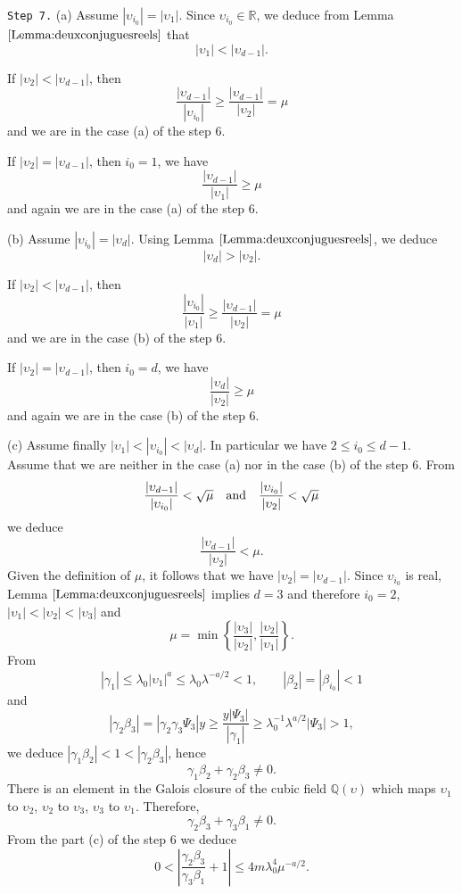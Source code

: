 \documentclass[leqno,11pt]{article}
\def\Q{\mathbb{Q}}
\def\R{\mathbb{R}}
\begin{document}
\indent
{\tt Step 7.} 
(a) Assume $|\upsilon_{i_0}|=|\upsilon_1|$. Since $\upsilon_{i_0}\in\R$, we deduce from Lemma $\ref{Lemma:deuxconjuguesreels}$ that
$$
|\upsilon_1|<|\upsilon_{d-1}|.
$$

If $|\upsilon_2|<|\upsilon_{d-1}|$, then 
$$
\frac{|\upsilon_{d-1}|}{|\upsilon_{i_0}|}\ge \frac{|\upsilon_{d-1}|}{|\upsilon_{2}|}=\mu
$$
and we are in the case (a) of the step 6. 

If $|\upsilon_2|=|\upsilon_{d-1}|$, then $i_0=1$, we have 
$$
\frac{|\upsilon_{d-1}|}{|\upsilon_1|}\ge \mu
$$
and again we are in the case (a) of the step 6. 

\indent
(b) Assume $|\upsilon_{i_0}|=|\upsilon_d|$. Using Lemma $\ref{Lemma:deuxconjuguesreels}$, we deduce 
$$
|\upsilon_d|>|\upsilon_2|.
$$

If $|\upsilon_2|<|\upsilon_{d-1}|$, then 
$$
\frac{|\upsilon_{i_0}|}{|\upsilon_1|}\ge \frac{|\upsilon_{d-1}|}{|\upsilon_{2}|}=\mu
$$
and we are in the case (b) of the step 6. 

If $|\upsilon_2|=|\upsilon_{d-1}|$, then $i_0=d$, we have 
$$
\frac{|\upsilon_d|}{|\upsilon_2|}\ge \mu
$$
and again we are in the case (b) of the step 6. 

\indent
(c) Assume finally $|\upsilon_1|<|\upsilon_{i_0}|<|\upsilon_d|$. In particular we have $2\le i_0\le d-1$. 
Assume that we are neither in the case (a) nor in the case (b) of the step 6. From 
$$
\frac{|\upsilon_{d-1}|}{|\upsilon_{i_0}|}< \sqrt{\mu}
\quad\hbox{and}\quad
\frac{|\upsilon_{i_0}|}{|\upsilon_2|}< \sqrt{\mu}
$$
we deduce
$$
\frac{|\upsilon_{d-1}|}{|\upsilon_2|}< \mu.
$$
Given the definition of $\mu$, it follows that we have $|\upsilon_2|=|\upsilon_{d-1}|$. Since $\upsilon_{i_0}$ is real, Lemma $\ref{Lemma:deuxconjuguesreels}$ implies $d=3$ and therefore $i_0=2$, $|\upsilon_1|<|\upsilon_2|<|\upsilon_3|$ and
$$
\mu=\min\left\{ 
\frac{|\upsilon_3|}{|\upsilon_2|}, \frac{|\upsilon_2|}{|\upsilon_1|}
\right\}.
$$ 
From
$$
|\gamma_1|\le \lambda_0|\upsilon_1|^a\le \lambda_0\lambda^{-a/2}<1,
\qquad
|\beta_2|=|\beta_{i_0}|<1
$$
and
$$
|\gamma_2 \beta_3|=|\gamma_2 \gamma_3\Psi_3|y\ge \frac{y|\Psi_3|}{|\gamma_1|}\ge \lambda_0^{-1}\lambda^{a/2}|\Psi_3|>1,
$$
we deduce $|\gamma_1 \beta_2|<1<|\gamma_2 \beta_3|$, hence 
$$
\gamma_1\beta_2+ \gamma_2 \beta_3\not=0.
$$
There is an element in the Galois closure of the cubic field  $\Q(\upsilon)$ which maps $\upsilon_1$ to $\upsilon_2$, $\upsilon_2$ to $\upsilon_3$, $\upsilon_3$ to $\upsilon_1$. Therefore, 
$$
\gamma_2\beta_3+ \gamma_3 \beta_1 \not=0.
$$ 
From the part (c) of the step 6 we deduce
$$
0<
\left|
\frac{
\gamma_2\beta_3}{\gamma_3 \beta_1}+1
\right| 
\le 4m \lambda_0^4 \mu^{- a/2}.
$$
\end{document}
